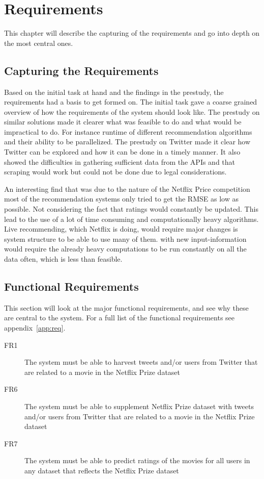 
\chapter{Requirements}

\minitoc

This chapter will describe the capturing of the requirements and go into depth on the most central ones.

\clearpage

\section{Capturing the Requirements}
Based on the initial task at hand and the findings in the prestudy, the requirements had a basis to get formed on. The initial task gave a coarse grained overview of how the requirements of the system should look like. The prestudy on similar solutions made it clearer what was feasible to do and what would be impractical to do. For instance runtime of different recommendation algorithms and their ability to be parallelized. The prestudy on Twitter made it clear how Twitter can be explored and how it can be done in a timely manner. It also showed the difficulties in gathering sufficient data from the APIs and that scraping would work but could not be done due to legal considerations.

An interesting find that was due to the nature of the Netflix Price competition most of the recommendation systems only tried to get the RMSE as low as possible. Not considering the fact that ratings would constantly be updated. This lead to the use of a lot of time consuming and computationally heavy algorithms. Live recommending, which Netflix is doing, would require major changes is system structure to be able to use many of them.
with new input-information would require the already heavy computations to be run constantly on all the data often, which is less than feasible.


\section{Functional Requirements}\label{section:functional-requirements}
This section will look at the major functional requirements, and see why these are central to the system. For a full list of the functional requirements see appendix~\ref{app:req}.
\begin{description}
  \item[FR1] The system must be able to harvest tweets and/or users from Twitter that are related to a movie in the Netflix Prize dataset
  \item[FR6] The system must be able to supplement Netflix Prize dataset with tweets and/or users from Twitter that are related to a movie in the Netflix Prize dataset
  \item[FR7] The system must be able to predict ratings of the movies for all users in any dataset that reflects the Netflix Prize dataset
\end{description}


